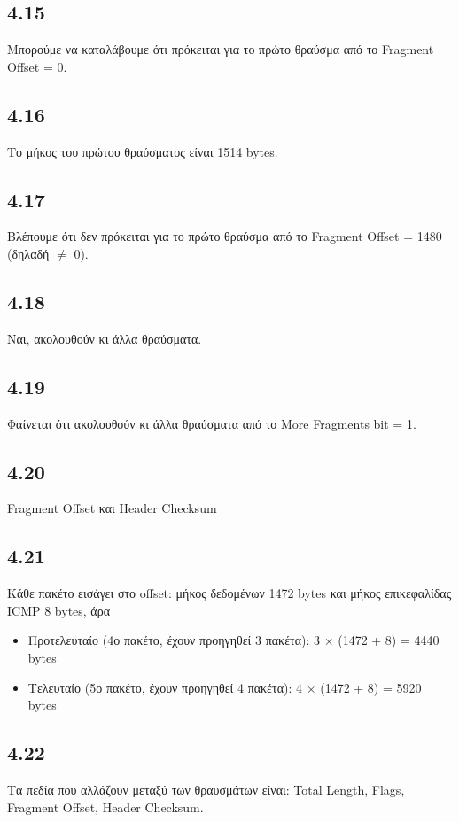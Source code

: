 		\subsection*{4.15}
			Μπορούμε να καταλάβουμε ότι πρόκειται για το πρώτο θραύσμα από το Fragment Offset = 0.

		\subsection*{4.16}
			Το μήκος του πρώτου θραύσματος είναι 1514 bytes.

		\subsection*{4.17}
			Βλέπουμε ότι δεν πρόκειται για το πρώτο θραύσμα από το Fragment Offset = 1480 (δηλαδή $\neq$ 0).

		\subsection*{4.18}
			Ναι, ακολουθούν κι άλλα θραύσματα.

		\subsection*{4.19}
			Φαίνεται ότι ακολουθούν κι άλλα θραύσματα από το More Fragments bit = 1.

		\subsection*{4.20}
			Fragment Offset και Header Checksum

		\subsection*{4.21}
			Κάθε πακέτο εισάγει στο offset: μήκος δεδομένων 1472 bytes και μήκος επικεφαλίδας ICMP 8 bytes, άρα
			
			\begin{itemize}
				\item Προτελευταίο (4ο πακέτο, έχουν προηγηθεί 3 πακέτα): 3 $\times$ (1472 + 8) = 4440 bytes 
				\item Τελευταίο (5ο πακέτο, έχουν προηγηθεί 4 πακέτα): 4 $\times$ (1472 + 8) = 5920 bytes
			\end{itemize} 

		\subsection*{4.22}
			Τα πεδία που αλλάζουν μεταξύ των θραυσμάτων είναι: Total Length, Flags, Fragment Offset, Header Checksum.

